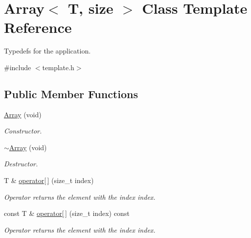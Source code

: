 \hypertarget{class_array}{\section{Array$<$ T, size $>$ Class Template Reference}
\label{class_array}
}


Typedefs for the application.  




{\ttfamily \#include $<$template.\-h$>$}

\subsection*{Public Member Functions}
\begin{DoxyCompactItemize}
\item 
\hypertarget{class_array_a5d56635d68d5e232ea1add891e5c6011}{\hyperlink{class_array_a5d56635d68d5e232ea1add891e5c6011}{Array} (void)}\label{class_array_a5d56635d68d5e232ea1add891e5c6011}

\begin{DoxyCompactList}\small\item\em Constructor. \end{DoxyCompactList}\item 
\hypertarget{class_array_a1a856ee487a0ba2fad309e234294f4f2}{\hyperlink{class_array_a1a856ee487a0ba2fad309e234294f4f2}{$\sim$\-Array} (void)}\label{class_array_a1a856ee487a0ba2fad309e234294f4f2}

\begin{DoxyCompactList}\small\item\em Destructor. \end{DoxyCompactList}\item 
T \& \hyperlink{class_array_a2cfcb63e168f5187ffb9d8e97f1d683e}{operator\mbox{[}$\,$\mbox{]}} (size\-\_\-t index)
\begin{DoxyCompactList}\small\item\em Operator returns the element with the index index. \end{DoxyCompactList}\item 
const T \& \hyperlink{class_array_ac2ed5d806f049cd35819ac8d6e5bada2}{operator\mbox{[}$\,$\mbox{]}} (size\-\_\-t index) const 
\begin{DoxyCompactList}\small\item\em Operator returns the element with the index index. \end{DoxyCompactList}\end{DoxyCompactItemize}


